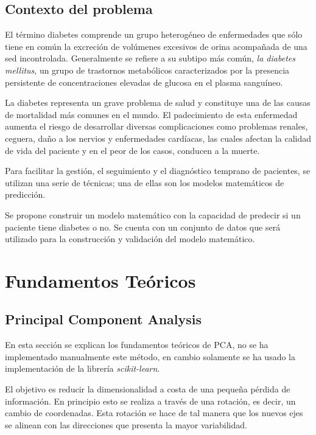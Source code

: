 \documentclass[letter, titlepage, 10pt]{article}
\begin{document}
\subsection{Contexto del problema}
El término diabetes comprende un grupo heterogéneo de enfermedades que sólo tiene en común la excreción de volúmenes excesivos de orina acompañada de una sed incontrolada. Generalmente se refiere a su subtipo más común, \textit{la diabetes mellitus}, un grupo de trastornos metabólicos caracterizados por la presencia persistente de concentraciones elevadas de glucosa en el plasma sanguíneo.

La diabetes representa un grave problema de salud y constituye una de las causas de mortalidad más comunes en el mundo. El padecimiento de esta enfermedad aumenta el riesgo de desarrollar diversas complicaciones como problemas renales, ceguera, daño a los nervios y enfermedades cardíacas, las cuales afectan la calidad de vida del paciente y en el peor de los casos, conducen a la muerte.

Para facilitar la gestión, el seguimiento y el diagnóstico temprano de pacientes, se utilizan una serie de técnicas; una de ellas son los modelos matemáticos de predicción.

Se propone construir un modelo matemático con la capacidad de predecir si un paciente tiene diabetes o no. Se cuenta con un conjunto de datos que será utilizado para la construcción y validación del modelo matemático.



\newpage

\section{Fundamentos Teóricos}

\subsection{Principal Component Analysis}
En esta sección se explican los fundamentos teóricos de PCA, no se ha implementado manualmente este método, en cambio solamente se ha usado la implementación de la librería \textit{scikit-learn}.

El objetivo es reducir la dimensionalidad a costa de una pequeña pérdida de información. En principio esto se realiza a través de una rotación, es decir, un cambio de coordenadas. Esta rotación se hace de tal manera que los nuevos ejes se alinean con las direcciones que presenta la mayor variabilidad.
\end{document}
